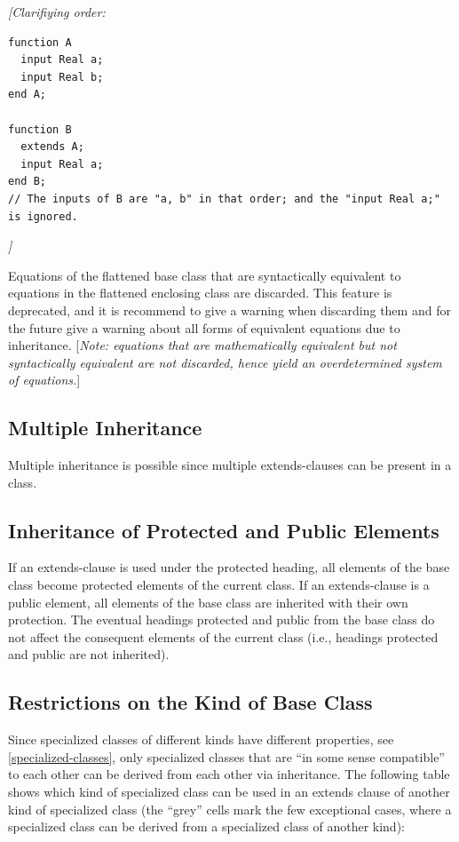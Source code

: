 \documentclass[10pt,a4paper]{report}
\def\doublelabel#1{\label{#1}}
\begin{document}
\emph{{[}Clarifiying order:}
\begin{lstlisting}[language=modelica]
function A
  input Real a;
  input Real b; 
end A;

function B
  extends A;
  input Real a;
end B;
// The inputs of B are "a, b" in that order; and the "input Real a;" is ignored.
\end{lstlisting}
\emph{{]}}

Equations of the flattened base class that are syntactically equivalent
to equations in the flattened enclosing class are discarded. This
feature is deprecated, and it is recommend to give a warning when
discarding them and for the future give a warning about all forms of
equivalent equations due to inheritance. {[}\emph{Note: equations that
are mathematically equivalent but not syntactically equivalent are not
discarded, hence yield an overdetermined system of equations.}{]}

\subsection{Multiple Inheritance}\doublelabel{multiple-inheritance}

Multiple inheritance is possible since multiple extends-clauses can be
present in a class.

\subsection{Inheritance of Protected and Public Elements}\doublelabel{inheritance-of-protected-and-public-elements}

If an extends-clause is used under the protected heading, all elements
of the base class become protected elements of the current class. If an
extends-clause is a public element, all elements of the base class are
inherited with their own protection. The eventual headings protected and
public from the base class do not affect the consequent elements of the
current class (i.e., headings protected and public are not inherited).

\subsection{Restrictions on the Kind of Base Class}\doublelabel{restrictions-on-the-kind-of-base-class}

Since specialized classes of different kinds have different properties,
see \ref{specialized-classes}, only specialized classes that are ``in some sense
compatible'' to each other can be derived from each other via
inheritance. The following table shows which kind of specialized class
can be used in an extends clause of another kind of specialized class
(the ``grey'' cells mark the few exceptional cases, where a specialized
class can be derived from a specialized class of another kind):
\end{document}
